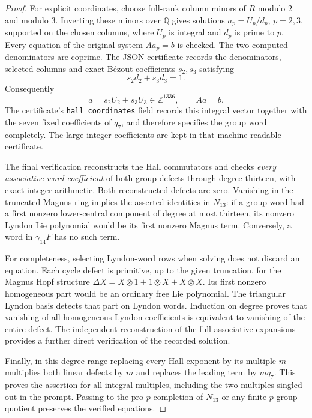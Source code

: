 \begin{proof}
For explicit coordinates, choose full-rank column minors of $R$
modulo $2$ and modulo $3$. Inverting these minors over $\mathbb Q$
gives solutions $a_p=U_p/d_p$, $p=2,3$, supported on the chosen
columns, where $U_p$ is integral and $d_p$ is prime to $p$.
Every equation of the original system $Aa_p=b$ is checked.
The two computed denominators are coprime. The JSON certificate
records the denominators, selected columns and exact B\'ezout
coefficients $s_2,s_3$ satisfying
\[
 s_2d_2+s_3d_3=1.
\]
Consequently
\[
 a=s_2U_2+s_3U_3\in\mathbb Z^{1336},\qquad Aa=b.
\]
The certificate's \texttt{hall\_coordinates} field records this
integral vector together with the seven fixed coefficients of
$q_7$, and therefore specifies the group word completely.
The large integer coefficients are kept in that machine-readable
certificate.

The final verification reconstructs the Hall commutators and
checks \emph{every associative-word coefficient} of both group
defects through degree thirteen, with exact integer arithmetic.
Both reconstructed defects are zero. Vanishing in the truncated
Magnus ring implies the asserted identities in $N_{13}$: if a
group word had a first nonzero lower-central component of degree
at most thirteen, its nonzero Lyndon Lie polynomial would be its
first nonzero Magnus term. Conversely, a word in $\gamma_{14}F$
has no such term.

For completeness, selecting Lyndon-word rows when solving does
not discard an equation. Each cycle defect is primitive, up to
the given truncation, for the Magnus Hopf structure
$\Delta X=X\otimes1+1\otimes X+X\otimes X$.
Its first nonzero homogeneous part would be an ordinary free
Lie polynomial. The triangular Lyndon basis detects that part
on Lyndon words. Induction on degree proves that vanishing of
all homogeneous Lyndon coefficients is equivalent to vanishing
of the entire defect. The independent reconstruction of the full
associative expansions provides a further direct verification
of the recorded solution.

Finally, in this degree range replacing every Hall exponent by
its multiple $m$ multiplies both linear defects by $m$ and
replaces the leading term by $m q_7$. This proves the assertion
for all integral multiples, including the two multiples singled
out in the prompt. Passing to the pro-$p$ completion of $N_{13}$
or any finite $p$-group quotient preserves the verified equations.
\end{proof}

